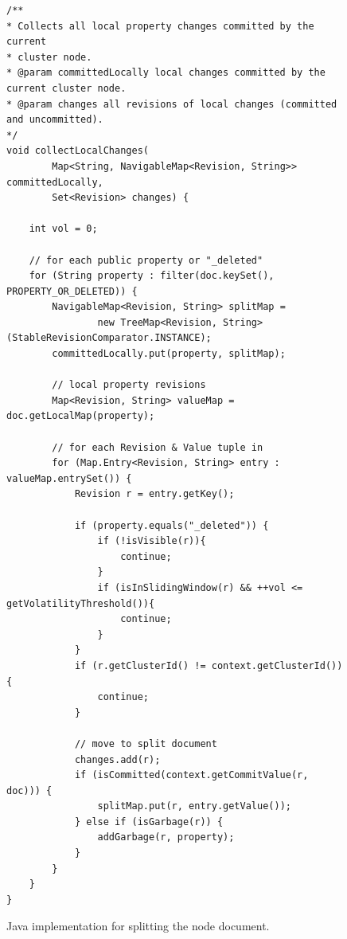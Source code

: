 \documentclass[abstracton,12pt]{scrreprt}
\begin{document}
\begin{figure}[h]
    \begin{framed}
        \begin{scriptsize}
            \begin{verbatim}
/**
* Collects all local property changes committed by the current
* cluster node.
* @param committedLocally local changes committed by the current cluster node.
* @param changes all revisions of local changes (committed and uncommitted).
*/
void collectLocalChanges(
        Map<String, NavigableMap<Revision, String>> committedLocally,
        Set<Revision> changes) {

    int vol = 0;
    
    // for each public property or "_deleted"
    for (String property : filter(doc.keySet(), PROPERTY_OR_DELETED)) {
        NavigableMap<Revision, String> splitMap =
                new TreeMap<Revision, String>(StableRevisionComparator.INSTANCE);
        committedLocally.put(property, splitMap);

        // local property revisions
        Map<Revision, String> valueMap = doc.getLocalMap(property);
        
        // for each Revision & Value tuple in 
        for (Map.Entry<Revision, String> entry : valueMap.entrySet()) {
            Revision r = entry.getKey();

            if (property.equals("_deleted")) {
                if (!isVisible(r)){
                    continue;
                }
                if (isInSlidingWindow(r) && ++vol <= getVolatilityThreshold()){
                    continue;
                }
            }
            if (r.getClusterId() != context.getClusterId()) {
                continue;
            }

            // move to split document
            changes.add(r);
            if (isCommitted(context.getCommitValue(r, doc))) {
                splitMap.put(r, entry.getValue());
            } else if (isGarbage(r)) {
                addGarbage(r, property);
            }
        }
    }
}
            \end{verbatim}
        \end{scriptsize}
    \end{framed}
    \caption{Java implementation for splitting the node document.}
    \label{algo:split_document}
\end{figure}
\end{document}
